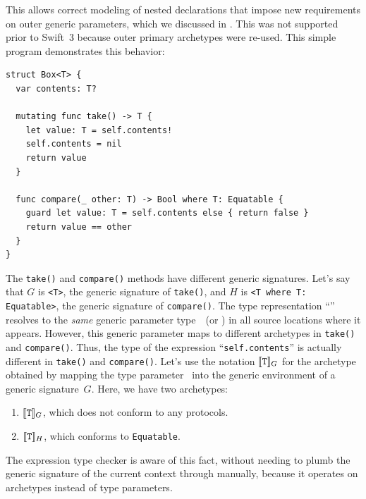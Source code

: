\documentclass[../generics]{subfiles}
\begin{document}
This allows correct modeling of nested declarations that impose new requirements on outer generic parameters, which we discussed in . This was not supported prior to Swift~3 because outer primary archetypes were re-used. This simple program demonstrates this behavior:
\begin{Verbatim}
struct Box<T> {
  var contents: T?

  mutating func take() -> T {
    let value: T = self.contents!
    self.contents = nil
    return value
  }

  func compare(_ other: T) -> Bool where T: Equatable {
    guard let value: T = self.contents else { return false }
    return value == other
  }
}
\end{Verbatim}
The \texttt{take()} and \texttt{compare()} methods have different generic signatures. Let's say that $G$ is \texttt{<T>}, the generic signature of \texttt{take()}, and $H$ is \texttt{<T where T: Equatable>}, the generic signature of \texttt{compare()}. The type representation ``\tT'' resolves to the \emph{same} generic parameter type~\tT\ (or \rT) in all source locations where it appears. However, this generic parameter maps to different archetypes in \texttt{take()} and \texttt{compare()}. Thus, the type of the expression ``\texttt{self.contents}'' is actually different in \texttt{take()} and \texttt{compare()}. Let's use the notation $[\![\texttt{T}]\!]_G$ for the archetype obtained by mapping the type parameter \tT\ into the generic environment of a generic signature~$G$. Here, we have two archetypes:
\begin{enumerate}
\item $[\![\texttt{T}]\!]_G$, which does not conform to any protocols.
\item $[\![\texttt{T}]\!]_H$, which conforms to \texttt{Equatable}.
\end{enumerate}
The expression type checker is aware of this fact, without needing to plumb the generic signature of the current context through manually, because it operates on archetypes instead of type parameters.
\end{document}
